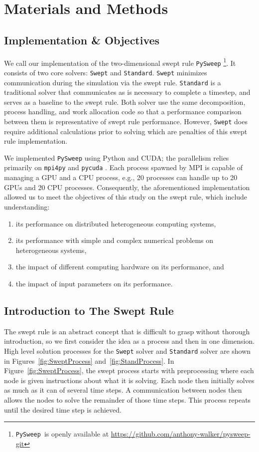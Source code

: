 \documentclass[mca,article,submit,moreauthors,pdftex]{Definitions/mdpi}
\def\github{\url{https://github.com/anthony-walker/pysweep-git}}
\def\pysweep{\texttt{PySweep}}
\def\Swept{\texttt{Swept}}
\def\Standard{\texttt{Standard}}
\begin{document}
\section{Materials and Methods}
\label{methods-section}

\subsection{Implementation \& Objectives}

We call our implementation of the two-dimensional swept rule \pysweep{} \footnote{\pysweep~is openly available at \github}. It consists of two core solvers: \Swept{} and \Standard{}. \Swept{} minimizes communication during the simulation via the swept rule. \Standard{} is a traditional solver that communicates as is necessary to complete a timestep, and serves as a baseline to the swept rule. Both solver use the same decomposition, process handling, and work allocation code so that a performance comparison between them is representative of swept rule performance. However, \Swept{} does require additional calculations prior to solving which are penalties of this swept rule implementation. 

We implemented \pysweep{} using Python and CUDA; the parallelism relies primarily on \texttt{mpi4py} \cite{dalcin_mpi_2005} and \texttt{pycuda} \cite{klockner_pycuda_2012}. Each process spawned by MPI is capable of managing a GPU and a CPU process, e.g., 20 processes can handle up to 20 GPUs and 20 CPU processes. Consequently, the aforementioned implementation allowed us to meet the objectives of this study on the swept rule, which include understanding:
\begin{enumerate}
    \item its performance on distributed heterogeneous computing systems,
    \item its performance with simple and complex numerical problems on heterogeneous systems,
    \item the impact of different computing hardware on its performance, and
    \item the impact of input parameters on its performance.
\end{enumerate}

\subsection{Introduction to The Swept Rule}
The swept rule is an abstract concept that is difficult to grasp without thorough introduction, so we first consider the idea as a process and then in one dimension. High level solution processes for the \Swept{} solver and \Standard{} solver are shown in  Figures~\ref{fig:SweptProcess} and~\ref{fig:StandProcess}. In Figure~\ref{fig:SweptProcess}, the swept process starts with preprocessing where each node is given instructions about what it is solving. Each node then initially solves as much as it can of several time steps. A communication between nodes then allows the nodes to solve the remainder of those time steps. This process repeats until the desired time step is achieved. 
\end{document}

